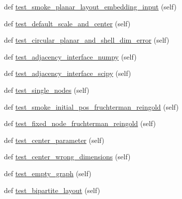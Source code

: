 \begin{DoxyCompactItemize}
\item 
def \hyperlink{classnetworkx_1_1drawing_1_1tests_1_1test__layout_1_1TestLayout_ab154f8de8b903a4385f4f0957a9406ad}{test\+\_\+smoke\+\_\+planar\+\_\+layout\+\_\+embedding\+\_\+input} (self)
\item 
def \hyperlink{classnetworkx_1_1drawing_1_1tests_1_1test__layout_1_1TestLayout_af5c92df5b693dc0b848ae2447f0c6ad8}{test\+\_\+default\+\_\+scale\+\_\+and\+\_\+center} (self)
\item 
def \hyperlink{classnetworkx_1_1drawing_1_1tests_1_1test__layout_1_1TestLayout_aa4487fbc66ffdd567fdbeced42447190}{test\+\_\+circular\+\_\+planar\+\_\+and\+\_\+shell\+\_\+dim\+\_\+error} (self)
\item 
def \hyperlink{classnetworkx_1_1drawing_1_1tests_1_1test__layout_1_1TestLayout_a6b89bf834fd80926bef145d185367b20}{test\+\_\+adjacency\+\_\+interface\+\_\+numpy} (self)
\item 
def \hyperlink{classnetworkx_1_1drawing_1_1tests_1_1test__layout_1_1TestLayout_a7ded71c5501c462eabbe979da9783405}{test\+\_\+adjacency\+\_\+interface\+\_\+scipy} (self)
\item 
def \hyperlink{classnetworkx_1_1drawing_1_1tests_1_1test__layout_1_1TestLayout_a23199a976175f762b7fffa465dcf9235}{test\+\_\+single\+\_\+nodes} (self)
\item 
def \hyperlink{classnetworkx_1_1drawing_1_1tests_1_1test__layout_1_1TestLayout_a17bdde9174c51d9519cf5a604166cf30}{test\+\_\+smoke\+\_\+initial\+\_\+pos\+\_\+fruchterman\+\_\+reingold} (self)
\item 
def \hyperlink{classnetworkx_1_1drawing_1_1tests_1_1test__layout_1_1TestLayout_adc96d2907819e5d9d51f7820fa198c30}{test\+\_\+fixed\+\_\+node\+\_\+fruchterman\+\_\+reingold} (self)
\item 
def \hyperlink{classnetworkx_1_1drawing_1_1tests_1_1test__layout_1_1TestLayout_a0c6e818a1fe11bcb196d5a8898156951}{test\+\_\+center\+\_\+parameter} (self)
\item 
def \hyperlink{classnetworkx_1_1drawing_1_1tests_1_1test__layout_1_1TestLayout_a31ef1f63b6f1ff93b00c1eb94e36f21e}{test\+\_\+center\+\_\+wrong\+\_\+dimensions} (self)
\item 
def \hyperlink{classnetworkx_1_1drawing_1_1tests_1_1test__layout_1_1TestLayout_a50201851be7ee78aa00ed83253342308}{test\+\_\+empty\+\_\+graph} (self)
\item 
def \hyperlink{classnetworkx_1_1drawing_1_1tests_1_1test__layout_1_1TestLayout_a06a958c8fad2d36f964a216e71e4b5cb}{test\+\_\+bipartite\+\_\+layout} (self)
\item 

\end{DoxyCompactItemize}
